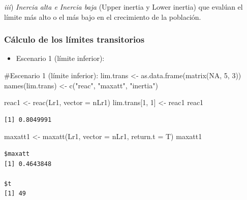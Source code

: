\documentclass[
  12pt,
  letterpaper,
]{book}
\newenvironment{Shaded}{\begin{snugshade}}{\end{snugshade}}
\newcommand{\AttributeTok}[1]{\textcolor[rgb]{0.40,0.45,0.13}{#1}}
\newcommand{\CommentTok}[1]{\textcolor[rgb]{0.37,0.37,0.37}{#1}}
\newcommand{\ConstantTok}[1]{\textcolor[rgb]{0.56,0.35,0.01}{#1}}
\newcommand{\DecValTok}[1]{\textcolor[rgb]{0.68,0.00,0.00}{#1}}
\newcommand{\FunctionTok}[1]{\textcolor[rgb]{0.28,0.35,0.67}{#1}}
\newcommand{\NormalTok}[1]{\textcolor[rgb]{0.00,0.23,0.31}{#1}}
\newcommand{\OtherTok}[1]{\textcolor[rgb]{0.00,0.23,0.31}{#1}}
\newcommand{\StringTok}[1]{\textcolor[rgb]{0.13,0.47,0.30}{#1}}
\providecommand{\tightlist}{%
  \setlength{\itemsep}{0pt}\setlength{\parskip}{0pt}}\usepackage{longtable,booktabs,array}
\begin{document}
\emph{iii}) \emph{Inercia alta e Inercia baja} (Upper inertia y Lower
inertia) que evalúan el límite más alto o el más bajo en el crecimiento
de la población.

\subsubsection{Cálculo de los límites
transitorios}\label{cuxe1lculo-de-los-luxedmites-transitorios}

\begin{itemize}
\tightlist
\item
  Escenario 1 (límite inferior):
\end{itemize}

\begin{Shaded}
\begin{Highlighting}[]
\CommentTok{\#Escenario 1 (límite inferior):}
\NormalTok{lim.trans }\OtherTok{\textless{}{-}} \FunctionTok{as.data.frame}\NormalTok{(}\FunctionTok{matrix}\NormalTok{(}\ConstantTok{NA}\NormalTok{, }\DecValTok{5}\NormalTok{, }\DecValTok{3}\NormalTok{))}
\FunctionTok{names}\NormalTok{(lim.trans) }\OtherTok{\textless{}{-}} \FunctionTok{c}\NormalTok{(}\StringTok{"reac"}\NormalTok{, }\StringTok{"maxatt"}\NormalTok{, }\StringTok{"inertia"}\NormalTok{)}

\NormalTok{reac1 }\OtherTok{\textless{}{-}} \FunctionTok{reac}\NormalTok{(Lr1, }\AttributeTok{vector =}\NormalTok{ nLr1)}
\NormalTok{lim.trans[}\DecValTok{1}\NormalTok{, }\DecValTok{1}\NormalTok{] }\OtherTok{\textless{}{-}}\NormalTok{ reac1}
\NormalTok{reac1}
\end{Highlighting}
\end{Shaded}

\begin{verbatim}
[1] 0.8049991
\end{verbatim}

\begin{Shaded}
\begin{Highlighting}[]
\NormalTok{maxatt1 }\OtherTok{\textless{}{-}} \FunctionTok{maxatt}\NormalTok{(Lr1, }\AttributeTok{vector =}\NormalTok{ nLr1, }\AttributeTok{return.t =}\NormalTok{ T)}
\NormalTok{maxatt1}
\end{Highlighting}
\end{Shaded}

\begin{verbatim}
$maxatt
[1] 0.4643848

$t
[1] 49
\end{verbatim}
\end{document}
